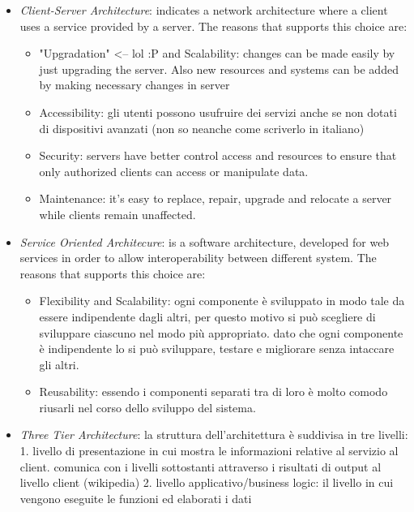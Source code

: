 \documentclass[english]{article}
\begin{document}
\begin{itemize}
  \item{\textit{Client-Server Architecture}: indicates a network architecture where a client uses a service provided by a server. The reasons that supports this choice are:
    \begin{itemize}
      \item{"Upgradation" <-- lol :P and Scalability: changes can be made easily by just upgrading the server. Also new resources and systems can be added by making necessary changes in server}
      \item{Accessibility: gli utenti possono usufruire dei servizi anche se non dotati di dispositivi avanzati (non so neanche come scriverlo in italiano)}
      \item{Security: servers have better control access and resources to ensure that only authorized clients can access or manipulate data.}
      \item{Maintenance: it’s easy to replace, repair, upgrade and relocate a server while clients remain unaffected.}
    \end{itemize}
  }
  \item{\textit{Service Oriented Architecure}: is a software architecture, developed for web services in order to allow interoperability between different system. The reasons that supports this choice are:
    \begin{itemize}
      \item{Flexibility and Scalability: ogni componente è sviluppato in modo tale da essere indipendente dagli altri, per questo motivo si può scegliere di sviluppare ciascuno nel modo più appropriato.
                                          dato che ogni componente è indipendente lo si può sviluppare, testare e migliorare senza intaccare gli altri.}
      \item{Reusability: essendo i componenti separati tra di loro è molto comodo riusarli nel corso dello sviluppo del sistema.}
      \end{itemize}
  }
  \item{\textit{Three Tier Architecture}: la struttura dell'architettura è suddivisa in tre livelli:
                                        1. livello di presentazione in cui mostra le informazioni relative al servizio al client.
                                          comunica con i livelli sottostanti attraverso i risultati di output al livello client (wikipedia)
                                        2. livello applicativo/business logic: il livello in cui vengono eseguite le funzioni ed elaborati i dati
}
\end{itemize}
\end{document}
